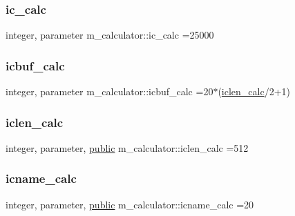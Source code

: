 \mbox{\label{namespacem__calculator_a462e5bf8d038196149ba96c22a614284}} 
\subsubsection{\texorpdfstring{ic\+\_\+calc}{ic\_calc}}
{\footnotesize\ttfamily integer, parameter m\+\_\+calculator\+::ic\+\_\+calc =25000\hspace{0.3cm}{\ttfamily [private]}}

\mbox{\label{namespacem__calculator_ae948e91eea8ea15aabe598f464ca80da}} 
\subsubsection{\texorpdfstring{icbuf\+\_\+calc}{icbuf\_calc}}
{\footnotesize\ttfamily integer, parameter m\+\_\+calculator\+::icbuf\+\_\+calc =20$\ast$(\hyperlink{namespacem__calculator_accf705491e8bd9b3d2f0d04fd13712e7}{iclen\+\_\+calc}/2+1)\hspace{0.3cm}{\ttfamily [private]}}

\mbox{\label{namespacem__calculator_accf705491e8bd9b3d2f0d04fd13712e7}} 
\subsubsection{\texorpdfstring{iclen\+\_\+calc}{iclen\_calc}}
{\footnotesize\ttfamily integer, parameter, \hyperlink{M__stopwatch_83_8txt_a2f74811300c361e53b430611a7d1769f}{public} m\+\_\+calculator\+::iclen\+\_\+calc =512}

\mbox{\label{namespacem__calculator_a482f8880712dc8f52ef6833de3243875}} 
\subsubsection{\texorpdfstring{icname\+\_\+calc}{icname\_calc}}
{\footnotesize\ttfamily integer, parameter, \hyperlink{M__stopwatch_83_8txt_a2f74811300c361e53b430611a7d1769f}{public} m\+\_\+calculator\+::icname\+\_\+calc =20}

